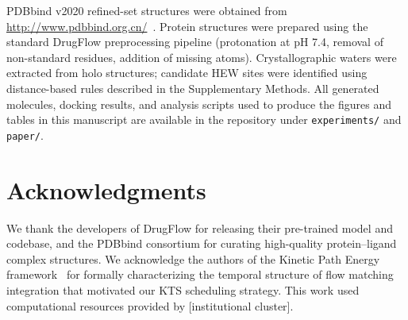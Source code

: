 \documentclass[11pt,letterpaper]{article}
\begin{document}
PDBbind v2020 refined-set structures were obtained from
\url{http://www.pdbbind.org.cn/}~\cite{wang2004pdbbind}.  Protein structures
were prepared using the standard DrugFlow preprocessing pipeline (protonation at
pH 7.4, removal of non-standard residues, addition of missing atoms).
Crystallographic waters were extracted from holo structures; candidate HEW sites
were identified using distance-based rules described in the Supplementary
Methods.  All generated molecules, docking results, and analysis scripts used to
produce the figures and tables in this manuscript are available in the
repository under \texttt{experiments/} and \texttt{paper/}.

\section{Acknowledgments}

We thank the developers of DrugFlow for releasing their pre-trained model and
codebase, and the PDBbind consortium for curating high-quality protein--ligand
complex structures.  We acknowledge the authors of the Kinetic Path Energy
framework~\cite{li2026kpe} for formally characterizing the temporal structure
of flow matching integration that motivated our KTS scheduling strategy.  This
work used computational resources provided by [institutional cluster].
\end{document}
